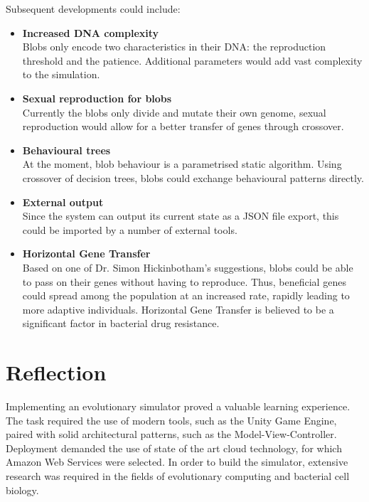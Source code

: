 Subsequent developments could include:
\begin{itemize}
	\item \textbf{Increased DNA complexity} \\ Blobs only encode two characteristics in their DNA: the reproduction threshold and the patience. Additional parameters would add vast complexity to the simulation.
	\item \textbf{Sexual reproduction for blobs} \\ Currently the blobs only divide and mutate their own genome, sexual reproduction would allow for a better transfer of genes through crossover.
	\item \textbf{Behavioural trees} \\ At the moment, blob behaviour is a parametrised static algorithm. Using crossover of decision trees, blobs could exchange behavioural patterns directly.
	\item \textbf{External output} \\ Since the system can output its current state as a JSON file export, this could be imported by a number of external tools.
	\item \textbf{Horizontal Gene Transfer~\cite{jain1999horizontal}} \\ Based on one of Dr. Simon Hickinbotham's suggestions, blobs could be able to pass on their genes without having to reproduce. Thus, beneficial genes could spread among the population at an increased rate, rapidly leading to more adaptive individuals. Horizontal Gene Transfer is believed to be a significant factor in bacterial drug resistance.
\end{itemize}

\section{Reflection}

Implementing an evolutionary simulator proved a valuable learning experience. The task required the use of modern tools, such as the Unity Game Engine, paired with solid architectural patterns, such as the Model-View-Controller. Deployment demanded the use of state of the art cloud technology, for which Amazon Web Services were selected. In order to build the simulator, extensive research was required in the fields of evolutionary computing and bacterial cell biology.